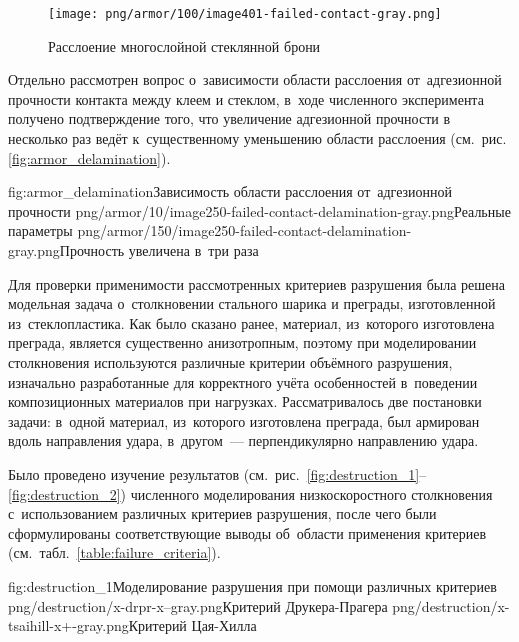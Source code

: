 \documentclass[a4paper,14pt]{extarticle}
\numberwithin{equation}{section}
\begin{document}
        \begin{figure}[h]
            \begin{center}
                \texttt{[image: png/armor/100/image401-failed-contact-gray.png]}
            \end{center}
            \caption{Расслоение многослойной стеклянной брони}
            \label{fig:armor}
        \end{figure}

        Отдельно рассмотрен вопрос о~зависимости области расслоения от~адгезионной прочности контакта между клеем и
        стеклом, в~ходе численного эксперимента получено подтверждение того, что увеличение адгезионной прочности в~
        несколько раз ведёт к~существенному уменьшению области расслоения
        (см.~рис. \ref{fig:armor_delamination}).

        \twofigs
            {fig:armor_delamination}{Зависимость области расслоения от~адгезионной прочности}
            {png/armor/10/image250-failed-contact-delamination-gray.png}{Реальные параметры}
            {png/armor/150/image250-failed-contact-delamination-gray.png}{Прочность увеличена в~три раза}

        Для проверки применимости рассмотренных критериев разрушения была решена модельная задача о~столкновении
        стального шарика и преграды, изготовленной из~стеклопластика. Как было сказано ранее, материал, из~которого
        изготовлена преграда, является существенно анизотропным, поэтому при моделировании столкновения используются
        различные критерии объёмного разрушения, изначально разработанные для корректного учёта особенностей в~поведении
        композиционных материалов при нагрузках. Рассматривалось две постановки задачи: в~одной материал, из~которого
        изготовлена преграда, был армирован вдоль направления удара, в~другом~--- перпендикулярно направлению удара.

        Было проведено изучение результатов (см.~рис.~\ref{fig:destruction_1}--\ref{fig:destruction_2}) численного
        моделирования низкоскоростного столкновения с~использованием различных критериев разрушения, после чего были
        сформулированы соответствующие выводы об~области применения критериев (см.~табл.~\ref{table:failure_criteria}).

        \twofigsH
            {fig:destruction_1}{Моделирование разрушения при помощи различных критериев}
            {png/destruction/x-drpr-x--gray.png}{Критерий Друкера-Прагера}
            {png/destruction/x-tsaihill-x+-gray.png}{Критерий Цая-Хилла}
\end{document}
